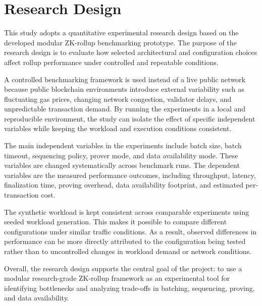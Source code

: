 
\section{Research Design}
\label{sec:research_design}

This study adopts a quantitative experimental research design based on the developed modular ZK-rollup benchmarking prototype. The purpose of the research design is to evaluate how selected architectural and configuration choices affect rollup performance under controlled and repeatable conditions.

A controlled benchmarking framework is used instead of a live public network because public blockchain environments introduce external variability such as fluctuating gas prices, changing network congestion, validator delays, and unpredictable transaction demand. By running the experiments in a local and reproducible environment, the study can isolate the effect of specific independent variables while keeping the workload and execution conditions consistent.

The main independent variables in the experiments include batch size, batch timeout, sequencing policy, prover mode, and data availability mode. These variables are changed systematically across benchmark runs. The dependent variables are the measured performance outcomes, including throughput, latency, finalization time, proving overhead, data availability footprint, and estimated per-transaction cost.

The synthetic workload is kept consistent across comparable experiments using seeded workload generation. This makes it possible to compare different configurations under similar traffic conditions. As a result, observed differences in performance can be more directly attributed to the configuration being tested rather than to uncontrolled changes in workload demand or network conditions.

Overall, the research design supports the central goal of the project: to use a modular research-grade ZK-rollup framework as an experimental tool for identifying bottlenecks and analyzing trade-offs in batching, sequencing, proving, and data availability.

